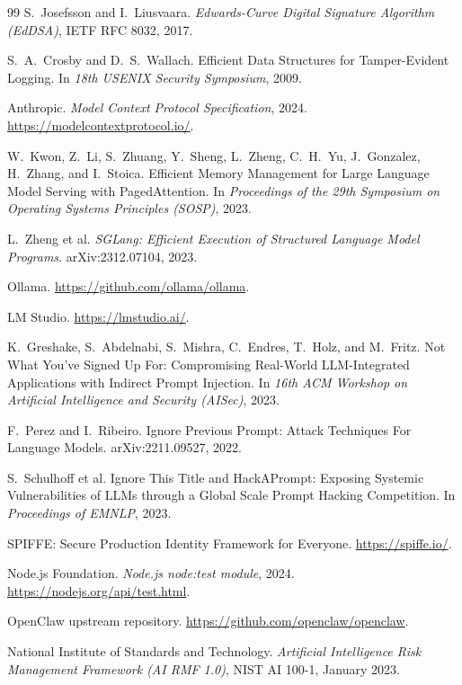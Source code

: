 \documentclass[11pt]{article}
\begin{document}
\begin{thebibliography}{99}
S.~Josefsson and I.~Liusvaara.
\emph{Edwards-Curve Digital Signature Algorithm (EdDSA)}, IETF RFC
8032, 2017.

S.~A.~Crosby and D.~S.~Wallach.
Efficient Data Structures for Tamper-Evident Logging.
In \emph{18th USENIX Security Symposium}, 2009.

Anthropic.
\emph{Model Context Protocol Specification}, 2024.
\url{https://modelcontextprotocol.io/}.

W.~Kwon, Z.~Li, S.~Zhuang, Y.~Sheng, L.~Zheng, C.~H.~Yu, J.~Gonzalez,
H.~Zhang, and I.~Stoica.
Efficient Memory Management for Large Language Model Serving with
PagedAttention.
In \emph{Proceedings of the 29th Symposium on Operating Systems
Principles (SOSP)}, 2023.

L.~Zheng et al.
\emph{SGLang: Efficient Execution of Structured Language Model Programs}.
arXiv:2312.07104, 2023.

Ollama. \url{https://github.com/ollama/ollama}.

LM Studio. \url{https://lmstudio.ai/}.

K.~Greshake, S.~Abdelnabi, S.~Mishra, C.~Endres, T.~Holz, and M.~Fritz.
Not What You've Signed Up For: Compromising Real-World LLM-Integrated
Applications with Indirect Prompt Injection.
In \emph{16th ACM Workshop on Artificial Intelligence and Security
(AISec)}, 2023.

F.~Perez and I.~Ribeiro.
Ignore Previous Prompt: Attack Techniques For Language Models.
arXiv:2211.09527, 2022.

S.~Schulhoff et al.
Ignore This Title and HackAPrompt: Exposing Systemic Vulnerabilities
of LLMs through a Global Scale Prompt Hacking Competition.
In \emph{Proceedings of EMNLP}, 2023.

SPIFFE: Secure Production Identity Framework for Everyone.
\url{https://spiffe.io/}.

Node.js Foundation.
\emph{Node.js node:test module}, 2024.
\url{https://nodejs.org/api/test.html}.

OpenClaw upstream repository.
\url{https://github.com/openclaw/openclaw}.

National Institute of Standards and Technology.
\emph{Artificial Intelligence Risk Management Framework (AI RMF 1.0)},
NIST AI 100-1, January 2023.


\end{thebibliography}
\end{document}
